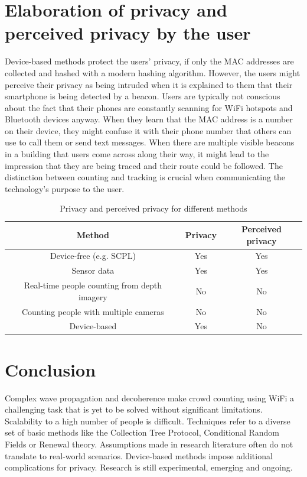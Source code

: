 \documentclass[conference]{IEEEtran}
\begin{document}
\section{Elaboration of privacy and perceived privacy by the user}
Device-based methods protect the users' privacy, if only the MAC addresses are collected and hashed with a modern hashing algorithm. However, the users might perceive their privacy as being intruded when it is explained to them that their smartphone is being detected by a beacon. Users are typically not conscious about the fact that their phones are constantly scanning for WiFi hotspots and Bluetooth devices anyway. When they learn that the MAC address is a number on their device, they might confuse it with their phone number that others can use to call them or send text messages. When there are multiple visible beacons in a building that users come across along their way, it might lead to the impression that they are being traced and their route could be followed. The distinction between counting and tracking is crucial when communicating the technology's purpose to the user.
\begin{table}
\caption{Privacy and perceived privacy for different methods}
\label{table_privacy}
\centering
\begin{tabular}{c || c || c}
\hline
\bfseries \textbf{Method} & \textbf{Privacy} & \bfseries\textbf{Perceived privacy} \\
\hline
Device-free (e.g. SCPL) & Yes & Yes\\
\hline
Sensor data & Yes & Yes \\
\hline
Real-time people counting from depth imagery & No & No \\
\hline
Counting people with multiple cameras & No & No \\
\hline
Device-based & Yes & No
\end{tabular}
\end{table}

\section{Conclusion}
Complex wave propagation and decoherence make crowd counting using WiFi a challenging task that is yet to be solved without significant limitations. Scalability to a high number of people is difficult. Techniques refer to a diverse set of basic methods like the Collection Tree Protocol, Conditional Random Fields or Renewal theory. Assumptions made in research literature often do not translate to real-world scenarios. Device-based methods impose additional complications for privacy. Research is still experimental, emerging and ongoing.
\end{document}

